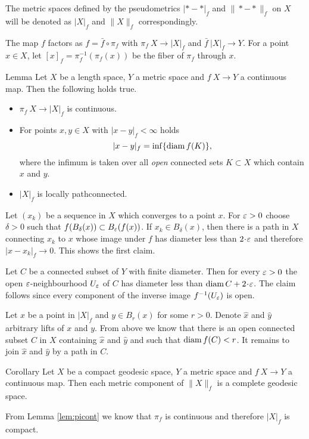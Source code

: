 \documentclass{article}
\begin{document}
The metric spaces defined by the pseudometrics $|{*}-{*}|_f$ 
and $\|{*}-{*}\|_f$ on $X$ will be denoted as $|X|_f$ and $\|X\|_f$ correspondingly.

\medskip

The map $f$ factors as $f=\bar f\circ \pi_f$ with $\pi_f\:X\to|X|_f$ and $\bar f\:|X|_f\to Y$.
For a point $x\in X$, let $[x]_f=\pi_f^{-1}(\pi_f(x))$ be the fiber of $\pi_f$ through $x$.

\begin{thm}{Lemma}\label{lem:picont}
Let $X$ be a length space, $Y$ a metric space and $f\:X\to Y$ a continuous map. Then the following holds true.
\begin{itemize}
 \item $\pi_f\:X\to|X|_f$ is continuous.
 \item For points $x,y\in X$ with $|x-y|_f<\infty$ holds
\[|x-y|_f=\inf\{\mathop{\rm diam}\nolimits f(K)\},\]
where the infimum is taken over all {\em open} connected sets $K\subset X$ which contain $x$ and $y$.
  \item $|X|_f$ is locally pathconnected.
\end{itemize}

\end{thm}
Let $(x_k)$ be a sequence in $X$ which converges to a point $x$. For $\varepsilon>0$ choose $\delta>0$ such that
$f(B_\delta(x))\subset B_\varepsilon(f(x))$. 
If $x_k\in B_\delta(x)$, then there is a path in $X$ connecting $x_k$
to $x$ whose image under $f$ has diameter less than $2\cdot\eps$ and therefore $|x-x_k|_f\to 0$. This shows the first claim.

Let $C$ be a connected subset of $Y$ with finite diameter. Then for every $\varepsilon>0$ the open $\varepsilon$-neighbourhood $U_\varepsilon$ of $C$ has diameter less than
$\diam C+2\cdot\eps$. The claim follows since every component of the inverse image $f^{-1}(U_\varepsilon)$ is open. 

Let $x$ be a point in $|X|_f$ and $y\in B_r(x)$ for some $r>0$. 
Denote $\hat x$ and $\hat y$ arbitrary lifts of $x$ and $y$.
From above we know that there is an open connected subset $C$ in $X$ containing $\hat x$ and $\hat y$ and such that 
$\mathop{\rm diam}\nolimits f(C)<r$. 
It remains to join $\hat x$ and $\hat y$ by a path in $C$.
\qeds

\begin{thm}{Corollary}\label{cor:geospace}
Let $X$ be a compact geodesic space, $Y$ a metric space and $f\:X\to Y$ a continuous map. Then each metric component of $\|X\|_f$ is a complete geodesic space.
\end{thm}
From Lemma \ref{lem:picont} we know that $\pi_f$ is continuous and therefore $|X|_f$ is compact.
\qeds
\end{document}
